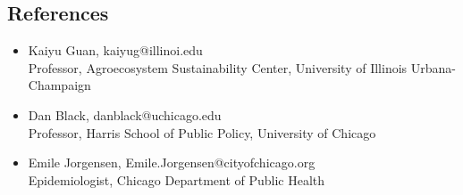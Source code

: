 \documentclass[margin,line]{resume}
\begin{document}
\begin{resume}
	\section{\mysidestyle References}
		\begin{itemize}

        \item Kaiyu Guan, kaiyug@illinoi.edu \\
            Professor, Agroecosystem Sustainability Center, University of Illinois Urbana-Champaign
        \item Dan Black, danblack@uchicago.edu \\
                Professor, Harris School of Public Policy, University of Chicago
	\item Emile Jorgensen, Emile.Jorgensen@cityofchicago.org \\
		Epidemiologist, Chicago Department of Public Health
		\end{itemize}
\end{resume}
\end{document}

